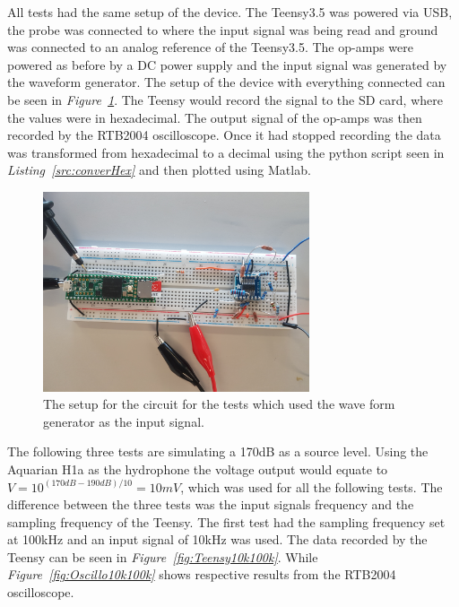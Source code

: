 All tests had the same setup of the device.
The Teensy3.5 was powered via USB, the probe was connected to where the input signal was being read and ground was connected to an analog reference of the Teensy3.5.
The op-amps were powered as before by a DC power supply and the input signal was generated by the waveform generator.
The setup of the device with everything connected can be seen in \textit{Figure~\ref{fig:testCircSetup}}.
The Teensy would record the signal to the SD card, where the values were in hexadecimal.
The output signal of the op-amps was then recorded by the RTB2004 oscilloscope.
Once it had stopped recording the data was transformed from hexadecimal to a decimal using the python script seen in \textit{Listing~\ref{src:converHex}} and then plotted using Matlab.


\begin{figure}[h]
    \centering
    \includegraphics[width=0.7\textwidth]{graphics/TestSetup.jpg}
    \caption{The setup for the circuit for the tests which used the wave form generator as the input signal.}
    \label{fig:testCircSetup}
\end{figure}

\vspace{4cm}

The following three tests are simulating a 170dB as a source level.
Using the Aquarian H1a as the hydrophone the voltage output would equate to  $V = 10^{(170dB-190dB)/10} = 10mV$, which was used for all the following tests.
The difference between the three tests was the input signals frequency and the sampling frequency of the Teensy.
The first test had the sampling frequency set at 100kHz and an input signal of 10kHz was used.
The data recorded by the Teensy can be seen in \textit{Figure~\ref{fig:Teensy10k100k}}.
While \textit{Figure~\ref{fig:Oscillo10k100k}} shows respective results from the RTB2004 oscilloscope.


